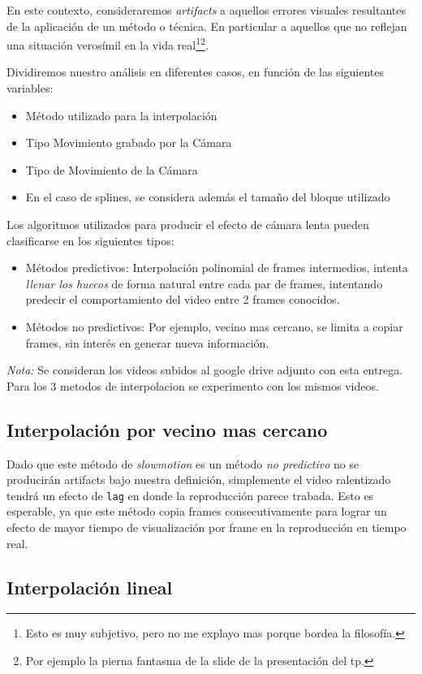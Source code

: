 En este contexto, consideraremos \emph{artifacts} a aquellos errores visuales resultantes de la aplicaci\'on de un m\'etodo o t\'ecnica. En particular a aquellos que no reflejan una situación verosímil en la vida real\footnote{Esto es muy subjetivo, pero no me explayo mas porque bordea la filosofía.}\footnote{Por ejemplo la pierna fantasma de la slide de la presentación del tp.}.

Dividiremos nuestro análisis en diferentes casos, en función de las siguientes variables:
\begin{itemize}
	\item Método utilizado para la interpolación
	\item Tipo Movimiento grabado por la Cámara
	\item Tipo de Movimiento de la Cámara
	\item En el caso de splines, se considera además el tamaño del bloque utilizado
\end{itemize}

Los algoritmos utilizados para producir el efecto de cámara lenta pueden clasificarse en los siguientes tipos:
\begin{itemize}
	\item Métodos predictivos: Interpolación polinomial de frames intermedios, intenta \emph{llenar los huecos} de forma natural entre cada par de frames, intentando predecir el comportamiento del video entre 2 frames conocidos.
	\item Métodos no predictivos: Por ejemplo, vecino mas cercano, se limita a copiar frames, sin interés en generar nueva información.
\end{itemize}

\emph{Nota:} Se consideran los videos subidos al google drive adjunto con esta entrega. Para los 3 metodos de interpolacion se experimento con los mismos videos.

\subsection{Interpolación por vecino mas cercano}
Dado que este método de \emph{slowmotion} es un método \emph{no predictivo} no se producirán artifacts bajo nuestra definición, simplemente el video ralentizado tendrá un efecto de \texttt{lag} en donde la reproducción parece trabada. Esto es esperable, ya que este método copia frames consecutivamente para lograr un efecto de mayor tiempo de visualización por frame en la reproducción en tiempo real. 

\subsection{Interpolación lineal}
